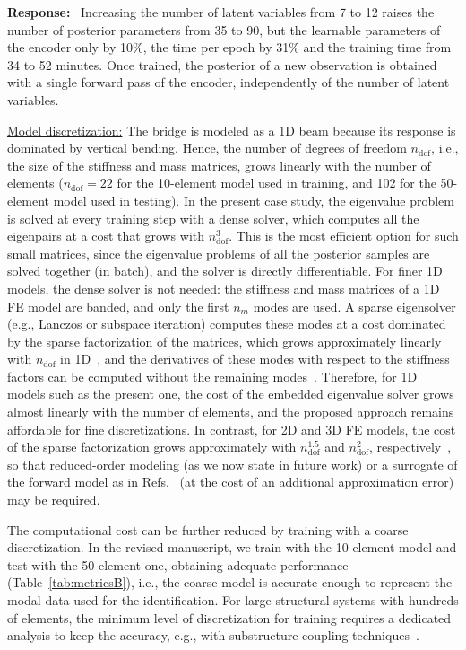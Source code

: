 \documentclass[11pt]{article}
\newenvironment{response}{\par\smallskip\noindent\color{resp}\textbf{Response:}\ }{\par}
\begin{document}
\begin{response}
Increasing the number of latent variables from 7 to 12 raises the number of posterior parameters from 35 to 90, but the learnable parameters of the encoder only by 10\%, the time per epoch by 31\% and the training time from 34 to 52 minutes. 
Once trained, the posterior of a new observation is obtained with a single forward pass of the encoder, independently of the number of latent variables.

\underline{Model discretization:}
The bridge is modeled as a 1D beam because its response is dominated by vertical bending.
Hence, the number of degrees of freedom $n_{\text{dof}}$, i.e., the size of the stiffness and mass matrices, grows linearly with the number of elements ($n_{\text{dof}}=22$ for the 10-element model used in training, and 102 for the 50-element model used in testing).
In the present case study, the eigenvalue problem is solved at every training step with a dense solver, which computes all the eigenpairs at a cost that grows with $n_{\text{dof}}^3$.
This is the most efficient option for such small matrices, since the eigenvalue problems of all the posterior samples are solved together (in batch), and the solver is directly differentiable.
For finer 1D models, the dense solver is not needed: the stiffness and mass matrices of a 1D FE model are banded, and only the first $n_m$ modes are used.
A sparse eigensolver (e.g., Lanczos or subspace iteration) computes these modes at a cost dominated by the sparse factorization of the matrices, which grows approximately linearly with $n_{\text{dof}}$ in 1D~\cite{george1973nested}, and the derivatives of these modes with respect to the stiffness factors can be computed without the remaining modes~\cite{nelson1976simplified}.
Therefore, for 1D models such as the present one, the cost of the embedded eigenvalue solver grows almost linearly with the number of elements, and the proposed approach remains affordable for fine discretizations.
In contrast, for 2D and 3D FE models, the cost of the sparse factorization grows approximately with $n_{\text{dof}}^{1.5}$ and $n_{\text{dof}}^{2}$, respectively~\cite{george1973nested}, so that reduced-order modeling (as we now state in future work) or a surrogate of the forward model as in Refs.~\cite{Navamuel_wes2025,Arxiv_Navamuel2026copula2d} (at the cost of an additional approximation error) may be required.

The computational cost can be further reduced by training with a coarse discretization.
In the revised manuscript, we train with the 10-element model and test with the 50-element one, obtaining adequate performance (Table~\ref{tab:metricsB}), i.e., the coarse model is accurate enough to represent the modal data used for the identification.
For large structural systems with hundreds of elements, the minimum level of discretization for training requires a dedicated analysis to keep the accuracy, e.g., with substructure coupling techniques~\cite{jensen2019sub}.
\end{response}
\end{document}
